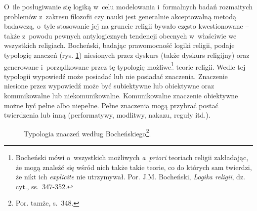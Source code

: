 O~ile posługiwanie się logiką w~celu modelowania i~formalnych badań rozmaitych problemów z~zakresu filozofii czy nauki jest generalnie akceptowalną metodą badawczą, o~tyle stosowanie jej na gruncie religii bywało często kwestionowane -- także z~powodu pewnych antylogicznych tendencji obecnych w~właściwie we wszystkich religiach. Bocheński, badając prawomocność logiki religii, podaje typologię znaczeń (rys. \ref{sil-boch-typ}) niesionych przez dyskurs (także dyskurs religijny) oraz generowane i~porządkowane przez tę typologię możliwe\footnote{Bocheński mówi o~wszystkich możliwych \textit{a~priori} teoriach religii zakładając, że mogą znaleźć się wśród nich także takie teorie, co do których sam twierdzi, że nikt ich \textit{explicite} nie utrzymywał. Por. J.M. Bocheński, \textit{Logika religii}, dz. cyt., ss.~347-352.} teorie religii. Wedle tej typologii wypowiedź może posiadać lub nie posiadać znaczenia. Znaczenie niesione przez wypowiedź może być subiektywne lub obiektywne oraz komunikowalne lub niekomunikowalne. Komunikowalne znaczenie obiektywne możne być pełne albo niepełne. Pełne znaczenia mogą przybrać postać twierdzenia lub inną (performatywy, modlitwy, nakazu, reguły itd.).
\begin{figure}[H]
\begin{center}

\caption[Typologia znaczeń według Bocheńskiego]{Typologia znaczeń według Bocheńskiego\footnote{Por. tamże, s.~348.}.}\label{sil-boch-typ}
\end{center}
\end{figure}



